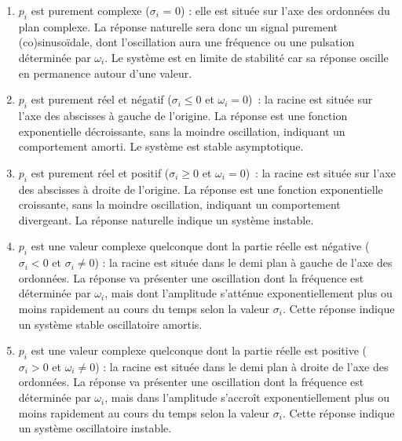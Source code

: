 	\begin{enumerate}
        \item $p_{i}$ est purement complexe ($\sigma_{i}$ = 0) : elle
          est située sur l'axe des ordonnées du plan complexe. La réponse
          naturelle sera donc un signal purement (co)sinusoïdale, dont
          l'oscillation aura une fréquence ou une pulsation déterminée
          par $\omega_{i}$. Le système est en limite de stabilité car
          sa réponse oscille en permanence autour d'une valeur.
        \item $p_{i}$ est purement réel et négatif ($ \sigma_i\leq 0$
          et $ \omega_i = 0$)~: la racine est située sur l'axe des
          abscisses à gauche de l'origine. La réponse est une fonction
          exponentielle décroissante, sans la moindre oscillation,
          indiquant un comportement amorti. Le système est stable
          asymptotique.
        \item $p_{i}$ est purement réel et positif ($ \sigma_i\geq 0$
          et $ \omega_i = 0$)~: la racine est située sur l'axe des
          abscisses à droite de l'origine. La réponse est une fonction
          exponentielle croissante, sans la moindre oscillation,
          indiquant un comportement divergeant. La réponse naturelle
          indique un système instable.
        \item $p_{i}$ est une valeur complexe quelconque dont la
          partie réelle est négative ($ \sigma_i< 0$ et
          $\sigma_{i} \neq 0 $) : la racine est située dans le demi
          plan à gauche de l'axe des ordonnées. La réponse va
          présenter une oscillation dont la fréquence est déterminée
          par $ \omega_{i}$, mais dont l'amplitude s'atténue
          exponentiellement plus ou moins rapidement au cours du temps
          selon la valeur $\sigma_{i}$. Cette réponse indique un
          système stable oscillatoire amortis.
        \item $p_{i}$ est une valeur complexe quelconque dont la
          partie réelle est positive ($\sigma_i > 0$ et
          $ \omega_{i} \neq 0 $) : la racine est située dans le demi
          plan à droite de l'axe des ordonnées. La réponse va présenter
          une oscillation dont la fréquence est déterminée par
          $ \omega_{i} $, mais dans l'amplitude s'accroît exponentiellement plus ou
          moins rapidement au cours du temps selon la valeur
          $\sigma_{i}$. Cette réponse indique un système oscillatoire instable.
	\end{enumerate}

